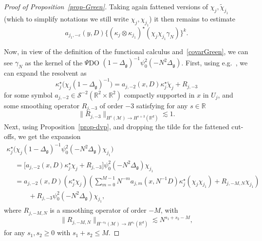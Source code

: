 \documentclass[AHL,Unicode,longabstracts,published]{cedram}
\newcommand{\R}{\mathbb{R}}
\renewcommand{\S}{\mathcal{S}}
\newcommand{\M}{\mathcal{M}}
\newcommand{\g}{\mathfrak{g}}
\newcommand{\Dlg}{\Delta_{\g}}
\newcommand{\eps}{\varepsilon}
\newcommand{\kk}{\kappa}
\newcommand{\wt}{\widetilde}
\newcommand{\les}{\lesssim}
\begin{document}
\begin{proof}[Proof of Proposition~\ref{prop-Green}]
Taking again fattened versions of $\chi_{j},\widetilde{\chi}_{j_{1}}$ (which to simplify notations we still write $\chi_{j},\chi_{j_{1}}$) it then remains to estimate
\begin{equation*}
a_{j_1,-\eps}(y,D)\big\{\left(\kk_{j}\otimes\kk_{j_1}\right)^{\star}\left(\chi_{j}\chi_{j_1}\gamma_N\right)\big\}^k.
\end{equation*}

Now, in view of the definition of the functional calculus and~\eqref{covarGreen}, we can see $\gamma_N$ as the kernel of the $\Psi$DO $(1-\Dlg)^{-1}\psi_0^2(-N^2\Dlg)$. First, using e.g.~\cite[Theorem~18.1.24]{HormanderIII}, we can expand the resolvent as
\begin{equation*}
\kk_j^{\star}\big(\chi_j(1-\Dlg)^{-1}\big) = a_{j,-2}(x,D)\kk_j^{\star}\wt\chi_j + R_{j,-3}
\end{equation*}
for some symbol $a_{j,-2}\in \S^{-2}(\R^2\times\R^2)$ compactly supported in $x$ in $U_j$, and some smoothing operator $R_{j,-3}$ of order $-3$ satisfying for any $s\in\R$
\begin{equation*}
\big\|R_{j,-3}\big\|_{H^{s}(\M)\to H^{s+3}(\R^d)}\les 1.
\end{equation*}
Next, using Proposition~\ref{prop-dvp}, and dropping the tilde for the fattened cut-offs, we get the expansion
\begin{multline*}
\kk_{j}^{\star}\big(\chi_{j}(1-\Dlg)^{-1}\psi_0^2\left(-N^2\Dlg\right)\chi_{j_1}\big)\\
\begin{aligned}
&=\Big[a_{j,-2}(x,D)\kk_{j}^{\star}\chi_{j} + R_{j,-3}\Big]\psi_0^2\left(-N^2\Dlg\right)\chi_{j_1}
\\&=a_{j,-2}(x,D)\left(\kk_j^\star\chi_{j}\right)\left(\sum_{m=0}^{M-1}N^{-m}a_{j,m}\left(x,N^{-1}D\right)\kk_j^{\star}\left(\chi_j\chi_{j_1}\right)+R_{j,-M,N}\chi_{j_1}\right)\\
&\qquad + R_{j,-3}\psi_0^2\left(-N^2\Dlg\right)\chi_{j_1},
\end{aligned}
\end{multline*}
where $R_{j,-M,N}$ is a smoothing operator of order $-M$, with
\begin{equation*}
\big\|R_{j,-M,N}\big\|_{H^{-s_2}(\M)\to H^{s_1}(\R^d)} \les N^{s_1+s_2-M},
\end{equation*}
for any $s_1,s_2\ge 0$ with $s_1+s_2\le M$.


\end{proof}
\end{document}
